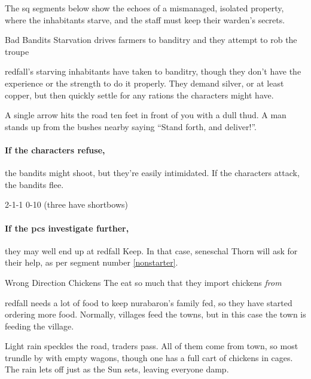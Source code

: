 The \gls{sq} \glspl{segment} below show the echoes of a mismanaged, isolated property, where the inhabitants starve, and the staff must keep their \gls{warden}'s secrets.

{Bad Bandits}%
{Starvation drives  farmers to banditry and they attempt to rob the troupe}%

\Gls{redfall}'s starving inhabitants have taken to banditry, though they don't have the experience or the strength to do it properly.
They demand silver, or at least copper, but then quickly settle for any rations the characters might have.

\begin{boxtext}
  A single arrow hits the road ten feet in front of you with a dull thud.
  A man stands up from the bushes nearby saying ``Stand forth, and deliver!''.
\end{boxtext}

\paragraph{If the characters refuse,}
the bandits might shoot, but they're easily intimidated.
If the characters attack, the bandits flee.

%
  {{2}{-1}{-1}}%
  {{0}{-1}{0}}%
  {%
    \Dagger
  }%
  {}%
  {(three have shortbows)}%
  {}%

\paragraph{If the \glspl{pc} investigate further,}
they may well end up at \gls{redfall} Keep.
In that case, \gls{seneschal} Thorn will ask for their help, as per \gls{segment} number \vref{nonstarter}.

{Wrong Direction Chickens}%
{The   eat so much that they import chickens \emph{from} }%

\Gls{redfall} needs a lot of food to keep \gls{nurabaron}'s family fed, so they have started ordering more food.
Normally, \glspl{village} feed the towns, but in this case the town is feeding the \gls{village}.

\begin{boxtext}
  Light rain speckles the road, traders pass.
  All of them come from \gls{town}, so most trundle by with empty wagons, though one has a full cart of chickens in cages.
  The rain lets off just as the Sun sets, leaving everyone damp.
\end{boxtext}

